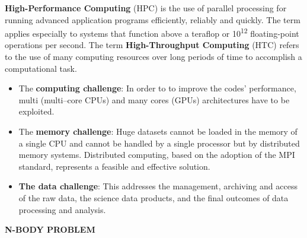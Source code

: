 \begin{observationblock}
    \textbf{High-Performance Computing} (HPC) is the use of parallel processing for running advanced application programs efficiently, reliably and quickly. The term applies especially to systems that function above a teraflop or 10\textsuperscript{12} floating-point operations per second. The term \textbf{High-Throughput Computing} (HTC) refers to the use of many computing resources over long periods of time to accomplish a computational task. 
\end{observationblock}

\begin{itemize}
    \item The \textbf{computing challenge}: In order to to improve the codes’ performance, multi
    (multi–core CPUs) and many cores (GPUs) architectures have to be exploited.
    \item The \textbf{memory challenge}: Huge datasets cannot be loaded in the memory of a
    single CPU and cannot be handled by a single processor but by distributed
    memory systems. Distributed computing, based on the adoption of the MPI
    standard, represents a feasible and effective solution.
    \item \textbf{The data challenge}: This addresses the management, archiving and access of
    the raw data, the science data products, and the final outcomes of data
    processing and analysis.
\end{itemize}
\vspace{0.5cm}
\textbf{N-BODY PROBLEM}
\vspace{0.5cm}

